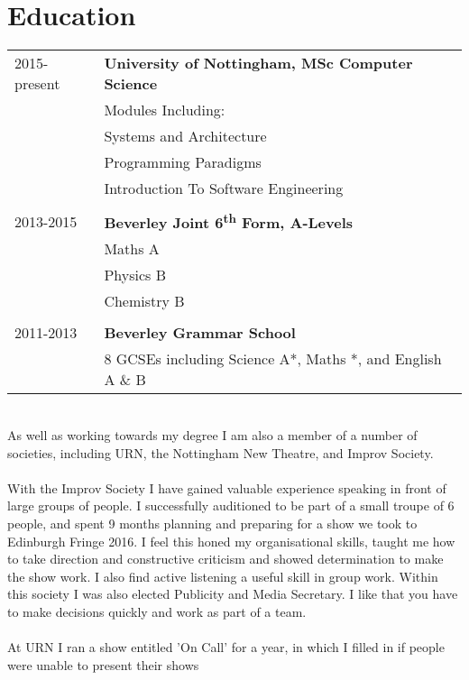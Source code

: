 \documentclass[12pt, a4paper]{article}
\begin{document}
\section*{Education}
\begin{tabular}[c]{p{2.5cm}|p{20cm}}
  2015-present  & \textbf{University of Nottingham, MSc Computer Science}
                \\
                & Modules Including:
                \\
                & Systems and Architecture
                \\
                & Programming Paradigms
                \\
                & Introduction To Software Engineering
                \\ \\
  2013-2015     & \textbf{Beverley Joint 6\textsuperscript{th} Form, A-Levels}
                \\
                & Maths A
                \\
                & Physics B
                \\
                & Chemistry B
                \\ \\
  2011-2013     & \textbf{Beverley Grammar School}
                \\
                & 8 GCSEs including Science A*, Maths *, and English A \& B
                \\
\end{tabular}
\\[10pt]
As well as working towards my degree I am also a member of a number of societies, including URN, the Nottingham New
Theatre, and Improv Society.\\
\\
With the Improv Society I have gained valuable experience speaking in front of large groups of people.
I successfully auditioned to be part of a small troupe of 6 people, and spent 9 months planning and preparing for a show we took to Edinburgh Fringe 2016.
I feel this honed my organisational skills, taught me how to take direction and constructive criticism and showed determination to make the show work.
I also find active listening a useful skill in group work.
Within this society I was also elected Publicity and Media Secretary.
I like that you have to make decisions quickly and work as part of a team.\\
\\
At URN I ran a show entitled 'On Call' for a year, in which I filled in if people were unable to present their shows
\end{document}

